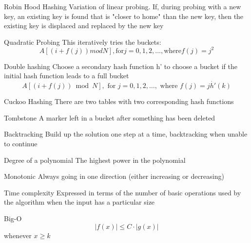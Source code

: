 \documentclass[grid,avery5371]{flashcards}
\begin{document}
\begin{flashcard}[]{Robin Hood Hashing}
	{\small
	Variation of linear probing. If, during probing with a new key, an existing key is found that is "closer to home" than the new key, then the existing key is displaced and replaced by the new key}
\end{flashcard}

\begin{flashcard}[]{Quadratic Probing}
{\small
This iteratively tries the buckets:
$$A[(i+f(j))mod N], \text{for} j=0,1,2,..., \text{where} f(j)=j^2$$
}
\end{flashcard}

\begin{flashcard}[]{Double hashing}
{\small
Choose a secondary hash function h' to choose a bucket if the initial hash function leads to a full bucket
\[
A[(i+f(j)) \bmod N], \text { for } j=0,1,2, \ldots, \text { where } f(j)=j \dot{h'}(k)
\]
}
\end{flashcard}

\begin{flashcard}[]{Cuckoo Hashing}
There are two tables with two corresponding hash functions
\end{flashcard}

\begin{flashcard}[]{Tombstone}
A marker left in a bucket after something has been deleted
\end{flashcard}

\begin{flashcard}[]{Backtracking}
	Build up the solution one step at a time, backtracking when unable to continue
\end{flashcard}

\begin{flashcard}[]{Degree of a polynomial}
	The highest power in the polynomial
\end{flashcard}

\begin{flashcard}[]{Monotonic}
	Always going in one direction (either increasing or decreasing)
\end{flashcard}


\begin{flashcard}[]{Time complexity}
	Expressed in terms of the number of basic operations used by the algorithm when the input has a particular size
\end{flashcard}

\begin{flashcard}[]{Big-O}
	$$|f(x)|\leqslant C\cdot |g(x)|$$
	whenever $x\geqslant k$
\end{flashcard}
\end{document}
